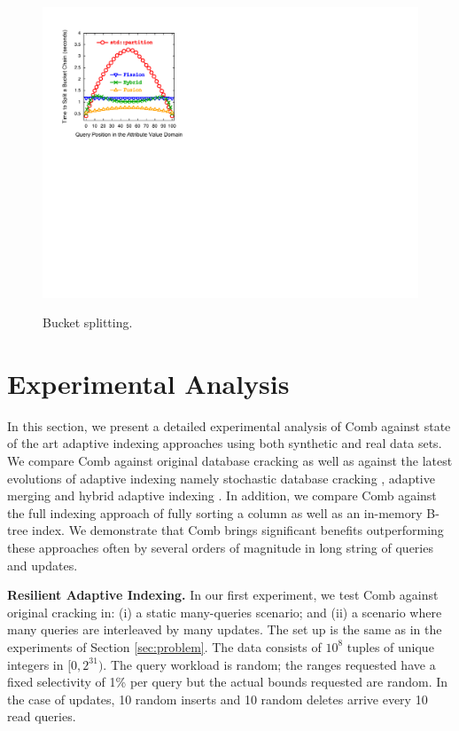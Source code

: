 \begin{figure}[t]
{\includegraphics[width=1.055\columnwidth]{graphs/fusion.pdf}%
\vspace{-1em}
\caption{Bucket splitting.}
\vspace{-1em}
\label{F:fussion}
}
\end{figure}

\section{Experimental Analysis}
\label{sec:experiments}

In this section, we present a detailed experimental analysis 
of Comb against state of the art adaptive indexing approaches using
both synthetic and real data sets. 
We compare Comb against original database cracking as well as against the latest 
evolutions of adaptive indexing namely stochastic database cracking \cite{StochasticCracking}, adaptive merging \cite{GK10b} 
and hybrid adaptive indexing \cite{AdaptiveIndexing}.
In addition, we compare Comb against the full indexing approach of fully sorting a column
as well as an in-memory B-tree index.
We demonstrate that Comb brings significant benefits outperforming these approaches
often by several orders of magnitude in long string of queries and updates. 


\newpage

\textbf{Resilient Adaptive Indexing.}
In our first experiment, we test Comb against original cracking in:
(i) a static many-queries scenario; and (ii) a scenario where many queries are interleaved by many updates.
The set up is the same as in the experiments of Section \ref{sec:problem}. 
The data consists of $10^8$ tuples of unique integers in $[0,2^{31})$.
The query workload is random; the ranges requested have a fixed selectivity of 1\% per query
but the actual bounds requested are random.
In the case of updates, 10 random inserts and 10 random deletes arrive every 10 read queries.

